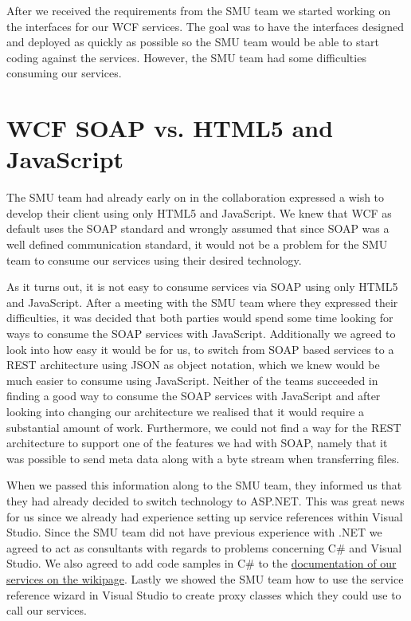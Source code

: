 \documentclass[../report.tex]{subfiles}
\begin{document}
After we received the requirements from the SMU team we started working on the interfaces for our WCF services. 
The goal was to have the interfaces designed and deployed as quickly as possible so the SMU team would be able to start coding against the services.
However, the SMU team had some difficulties consuming our services.
\section{WCF SOAP vs. HTML5 and JavaScript}
The SMU team had already early on in the collaboration expressed a wish to develop their client using only HTML5 and JavaScript. 
We knew that WCF as default uses the SOAP standard and wrongly assumed that since SOAP was a well defined communication standard, it would not be a problem for the SMU team to consume our services using their desired technology.

As it turns out, it is not easy to consume services via SOAP using only HTML5 and JavaScript.
After a meeting with the SMU team where they expressed their difficulties, it was decided that both parties would spend some time looking for ways to consume the SOAP services with JavaScript.
Additionally we agreed to look into how easy it would be for us, to switch from SOAP based services to a REST architecture using JSON as object notation, which we knew would be much easier to consume using JavaScript.
Neither of the teams succeeded in finding a good way to consume the SOAP services with JavaScript and after looking into changing our architecture we realised that it would require a substantial amount of work.
Furthermore, we could not find a way for the REST architecture to support one of the features we had with SOAP, namely that it was possible to send meta data along with a byte stream when transferring files.

When we passed this information along to the SMU team, they informed us that they had already decided to switch technology to ASP.NET.
This was great news for us since we already had experience setting up service references within Visual Studio.
Since the SMU team did not have previous experience with .NET we agreed to act as consultants with regards to problems concerning C\# and Visual Studio.
We also agreed to add code samples in C\# to the \href{https://wiki.smu.edu.sg/is411/Team8\_Services\_Documentation}{documentation of our services on the wikipage}\cite{SMU-Wiki-2}.
Lastly we showed the SMU team how to use the service reference wizard in Visual Studio to create proxy classes which they could use to call our services.
\end{document}
